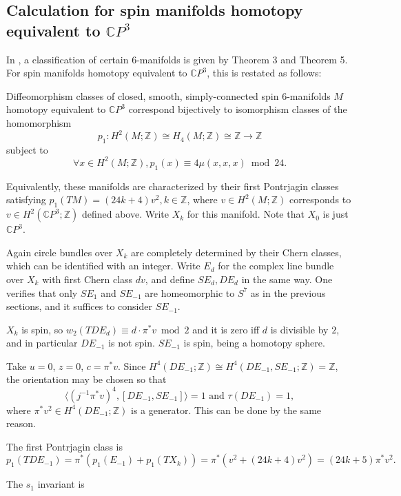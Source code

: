 \documentclass[twoside]{article}
\begin{document}
\subsection{Calculation for spin manifolds homotopy equivalent to \texorpdfstring{$\mathbb{C}P^3$}{CP3}}

In \cite{wall}, a classification of certain $6$-manifolds is given by Theorem 3 and Theorem 5. For spin manifolds homotopy equivalent to $\mathbb{C}P^3$, this is restated as follows:
\begin{thm}
	Diffeomorphism classes of closed, smooth, simply-connected spin $6$-manifolds $M$ homotopy equivalent to $\mathbb{C}P^3$ correspond bijectively to isomorphism classes of the homomorphism
	\[
	p_1 \colon H^2(M;\mathbb{Z}) \cong  H_4(M;\mathbb{Z}) \cong  \mathbb{Z} \to  \mathbb{Z}
	\]
	subject to 
	\[
	\forall x\in H^2(M;\mathbb{Z}), p_1(x) \equiv  4\mu(x,x,x) \bmod 24. 
	\]
\end{thm}

Equivalently, these manifolds are characterized by their first Pontrjagin classes satisfying $ p_1(TM) = (24k  +  4)v^2,k\in \mathbb{Z}$, where $v\in H^2(M;\mathbb{Z})$ corresponds to $v\in H^2(\mathbb{C}P^3;\mathbb{Z})$ defined above. Write $X_k$ for this manifold. Note that $X_0$ is just $\mathbb{C}P^3$. 

Again circle bundles over $X_k$ are completely determined by their Chern classes, which can be identified with an integer. 
Write $E_d$ for the complex line bundle over $X_k$ with first Chern class $dv$, and define $SE_d, DE_d$ in the same way. One verifies that only $SE_{1}$ and $SE_{-1}$ are homeomorphic to $S^7$ as in the previous sections, and it suffices to consider $SE_{-1}$. 

$X_k$ is spin, so $w_2(TDE_d) \equiv  d\cdot \pi^* v \bmod 2$ and it is zero iff $d$ is divisible by $2$, and in particular $DE_{-1}$ is not spin. $SE_{-1}$ is spin, being a homotopy sphere. 

Take $u = 0$, $z = 0$, $c = \pi^*v$. Since $H^4(DE_{-1};\mathbb{Z}) \cong  H^4(DE_{-1},SE_{-1};\mathbb{Z}) = \mathbb{Z}$, the orientation may be chosen so that
\[
\langle(j^{-1}\pi^*v)^4,[DE_{-1},SE_{-1}]\rangle = 1\text{ and }\tau(DE_{-1}) = 1, 
\]
where $\pi^*v^2\in H^4(DE_{-1};\mathbb{Z})$ is a generator. This can be done by the same reason. 

The first Pontrjagin class is 
\[
p_1(TDE_{-1}) = \pi^*(p_1(E_{-1}) + p_1(TX_k)) = \pi^*(v^2 + (24k  +  4)v^2) = (24k  +  5)\pi^*v^2. 
\]

The $s_1$ invariant is 
\end{document}
